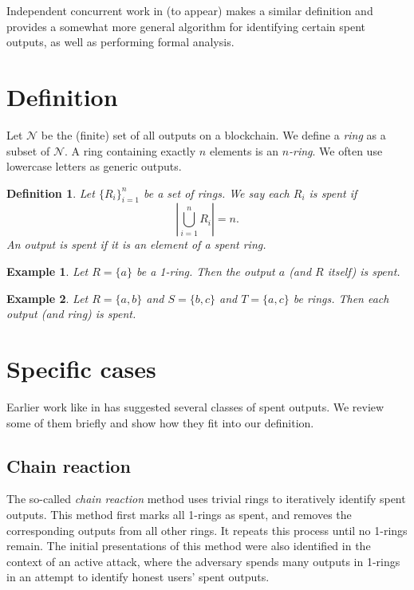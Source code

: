 \documentclass{mrl}
\newtheorem{definition}{Definition}
\newtheorem{example}{Example}
\begin{document}
Independent concurrent work in \cite{unpub1,unpub2} (to appear) makes a similar definition and provides a somewhat more general algorithm for identifying certain spent outputs, as well as performing formal analysis.

\section{Definition}
Let $\mathcal{N}$ be the (finite) set of all outputs on a blockchain. We define a \textit{ring} as a subset of $\mathcal{N}$. A ring containing exactly $n$ elements is an $n$\textit{-ring}. We often use lowercase letters as generic outputs.

\begin{definition}
Let $\{R_i\}_{i=1}^n$ be a set of rings. We say each $R_i$ is \textit{spent} if $$\left| \bigcup_{i=1}^n R_i \right| = n.$$ An output is \textit{spent} if it is an element of a spent ring.
\end{definition}

\begin{example}
Let $R = \{a\}$ be a 1-ring. Then the output $a$ (and $R$ itself) is spent.
\end{example}

\begin{example}
Let $R = \{a,b\}$ and $S = \{b,c\}$ and $T = \{a,c\}$ be rings. Then each output (and ring) is spent.
\end{example}

\section{Specific cases}
Earlier work like in \cite{mrl0001,mrl0004,kumar,moser,wijaya} has suggested several classes of spent outputs. We review some of them briefly and show how they fit into our definition.

\subsection{Chain reaction}
The so-called \textit{chain reaction} method uses trivial rings to iteratively identify spent outputs. This method first marks all 1-rings as spent, and removes the corresponding outputs from all other rings. It repeats this process until no 1-rings remain. The initial presentations of this method were also identified in the context of an active attack, where the adversary spends many outputs in 1-rings in an attempt to identify honest users' spent outputs.
\end{document}
